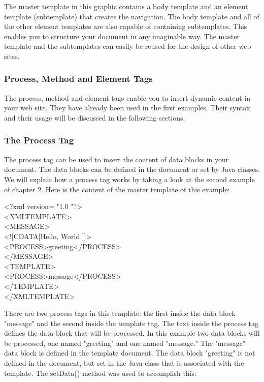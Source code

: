 The master template in this graphic contains a body template and an 
{}
element template (subtemplate) that creates the navigation. The body
template and all of the other element templates are also capable of
containing subtemplates. This enables you to structure your document in
any imaginable way. The master template and the subtemplates can easily
be reused for the design of other web sites.

\subsubsection{Process, Method and Element Tags}
The process, {\tag method} and {\tag element} tags enable you to insert dynamic
content in your web site. They have already been used in the first
examples. Their syntax and their usage will be discussed in the
following sections.

\subsubsection{The Process Tag}
The {\tag process} tag can be used to insert the content of data blocks in
your document. The data blocks can be defined in the document or set by
Java classes. We will explain how a process tag works by taking a look
at the second example of chapter 2.
Here is the content of the master template of this example:

\begin{xml}
<?xml version= "1.0 "?>\\
<XMLTEMPLATE>\\
<MESSAGE>\\
<![CDATA[Hello, World ]]>\\
<PROCESS>greeting</PROCESS>\\
</MESSAGE>\\

<TEMPLATE>\\
<PROCESS>message</PROCESS>\\
</TEMPLATE>\\
</XMLTEMPLATE>\\
\end{xml}

There are two process tags in this template: the first inside the data
block "message" and the second inside the template tag. The text inside
the process tag defines the data block that will be processed. In this
example two data blocks will be processed, one named "greeting" and one
named "message." The "message" data block is defined in the template
document. The data block "greeting" is not defined in the document, but
set in the Java class that is associated with the template. The
{\meth setData()} method was used to accomplish this:

